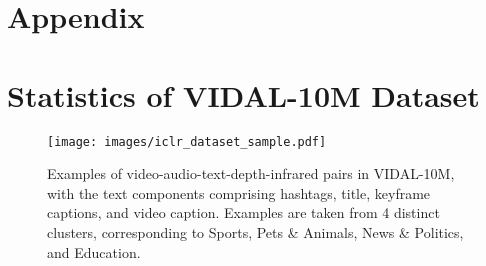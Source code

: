 \documentclass{article} \usepackage{iclr2024_conference,times}
\begin{document}



\clearpage































\appendix

\section*{Appendix}
\section{Statistics of VIDAL-10M Dataset}

\begin{figure*}[htbp]

\centering
    \texttt{[image: images/iclr\_dataset\_sample.pdf]}
    \caption{Examples of video-audio-text-depth-infrared pairs in VIDAL-10M, with the text components comprising hashtags, title, keyframe captions, and video caption. Examples are taken from 4 distinct clusters, corresponding to Sports, Pets \& Animals, News \& Politics, and Education.}
    \label{fig:overview}
\vspace{-0.4cm} 
\label{fig:samples of VIDAL-10M}
\end{figure*}
\end{document}
